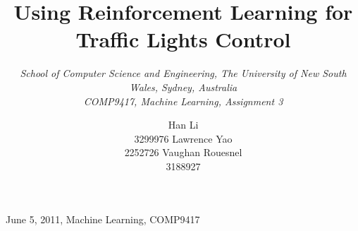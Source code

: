 \documentclass{sig-alternate}
\begin{document}
%
 {June 5, 2011, Machine Learning, COMP9417}  

\title{Using Reinforcement Learning for Traffic Lights Control}

\author{
\alignauthor
Han Li\\
       3299976
\alignauthor
Lawrence Yao\\
       2252726
\alignauthor
Vaughan Rouesnel\\
       3188927
}

\subtitle{
    \textit{School of Computer Science and Engineering, The University of New South Wales, Sydney, Australia} \\
    \textit{COMP9417, Machine Learning, Assignment 3}
    }

\maketitle















\balancecolumns
\end{document}
